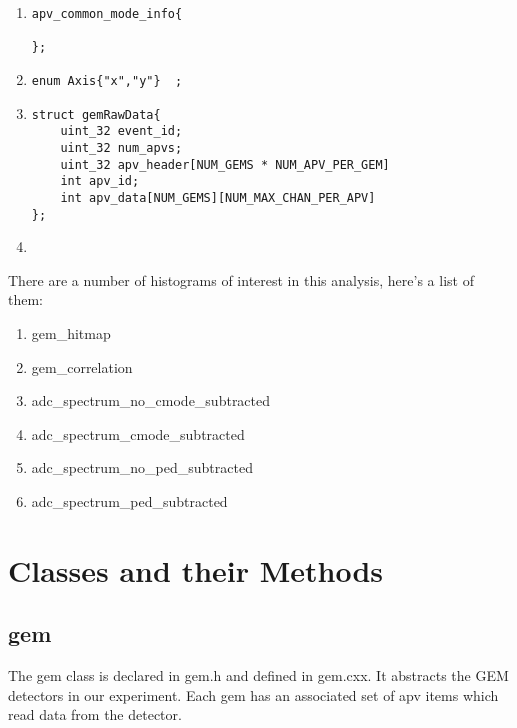 \documentclass[11pt]{article}
\begin{document}
\begin{enumerate}
	\item 
	\begin{lstlisting}	
apv_common_mode_info{

};
	\end{lstlisting}
	
	\item 
	\begin{lstlisting}	
enum Axis{"x","y"}	;
	\end{lstlisting}
	
	\item
	\begin{lstlisting}
struct gemRawData{
	uint_32 event_id;
	uint_32 num_apvs;
	uint_32 apv_header[NUM_GEMS * NUM_APV_PER_GEM]
	int apv_id;
	int apv_data[NUM_GEMS][NUM_MAX_CHAN_PER_APV]		
};
	\end{lstlisting}
	
	\item 
	\begin{lstlisting}	

	\end{lstlisting}
	
\end{enumerate}

There are a number of histograms of interest in this analysis, here's a list of them:

\begin{enumerate}
	\item gem\_hitmap
	\item gem\_correlation
	\item adc\_spectrum\_no\_cmode\_subtracted
	\item adc\_spectrum\_cmode\_subtracted
	\item adc\_spectrum\_no\_ped\_subtracted
	\item adc\_spectrum\_ped\_subtracted
	
\end{enumerate}

\section{Classes and their Methods}
	\subsection{gem}
	The gem class is declared in gem.h and defined in gem.cxx. It abstracts the GEM detectors in our experiment. Each gem has an associated set of apv items which read data from the detector. \\
 
\end{document}
